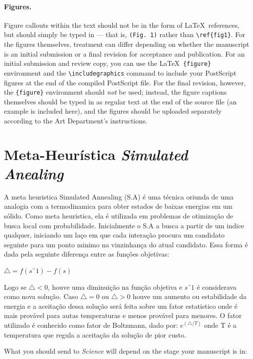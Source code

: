 \documentclass[12pt]{article}
\begin{document}
\paragraph*{Figures.}  Figure callouts within the text should not be
in the form of \LaTeX\ references, but should simply be typed in ---
that is, \verb+(Fig. 1)+ rather than \verb+\ref{fig1}+.  For the
figures themselves, treatment can differ depending on whether the
manuscript is an initial submission or a final revision for acceptance
and publication.  For an initial submission and review copy, you can
use the \LaTeX\ \verb+{figure}+ environment and the
\verb+\includegraphics+ command to include your PostScript figures at
the end of the compiled PostScript file.  For the final revision,
however, the \verb+{figure}+ environment should {\it not\/} be used;
instead, the figure captions themselves should be typed in as regular
text at the end of the source file (an example is included here), and
the figures should be uploaded separately according to the Art
Department's instructions.


\section*{Meta-Heurística \textit{Simulated Anealing}}

A meta heuristica Simulated Annealing (S.A) é uma técnica oriunda de uma analogia com a termodinamica para obter estados de baixas energias em um sólido. Como meta heuristica, ela é utilizada em problemas de otimização de busca local com probabilidade. 
Inicialmente o S.A a busca a partir de um indice qualquer, iniciando um laço em que cada interação procura um candidato seguinte para um ponto minimo na vinzinhança do atual candidato. Essa forma é dada pela seguinte diferença entre as funções objetivas:

$ {\triangle = f (sˆ1) - f(s) }$

Logo se $ {\triangle < 0 }$, houve uma diminuição na função objetiva e $ sˆ1$ é considerava como nova solução. Caso $ {\triangle = 0 }$ ou $ {\triangle > 0 }$ houve um aumento ou estabilidade da energia e a aceitação dessa solução será feita sobre um fator estatistico onde é mais provável para autas temperaturas e menos provável para menores. O fator utilizado é conhecido como fator de Boltzmann, dado por: $ {e^{(\triangle / T)} }$ onde T é a temperatura que regula a aceitação da solução de pior custo.

What you should send to {\it Science\/} will depend on the stage your manuscript is in:
\end{document}
